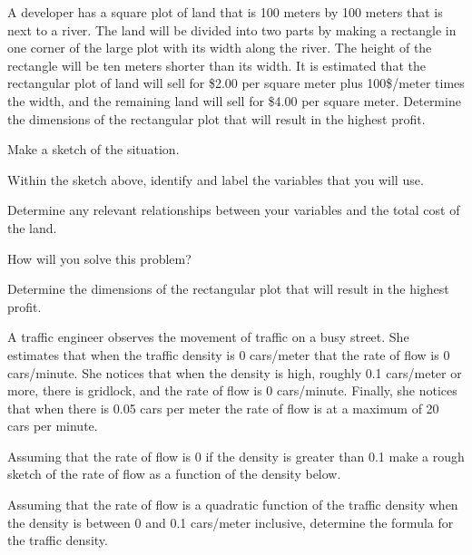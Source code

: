 \begin{problem}
\item A developer has a square plot of land that is 100 meters by 100
  meters that is next to a river. The land will be divided into two
  parts by making a rectangle in one corner of the large plot with its
  width along the river. The height of the rectangle will be ten
  meters shorter than its width. It is estimated that the rectangular
  plot of land will sell for \$2.00 per square meter plus 100\$/meter
  times the width, and the remaining land will sell for \$4.00 per
  square meter.  Determine the dimensions of the rectangular plot that
  will result in the highest profit.
  \begin{subproblem}
    \item Make a sketch of the situation.
      \vfill
    \item Within the sketch above, identify and label the variables
      that you will use.
    \item Determine any relevant relationships between your variables
      and the total cost of the land.
    \item How will you solve this problem?
      \vfill
    \item Determine the dimensions of the rectangular plot that will
      result in the highest profit.
      \vfill
      \vfill
  \end{subproblem}
  \clearpage
\item A traffic engineer observes the movement of traffic on a busy
  street. She estimates that when the traffic density is 0 cars/meter
  that the rate of flow is 0 cars/minute. She notices that when the
  density is high, roughly 0.1 cars/meter or more, there is gridlock,
  and the rate of flow is 0 cars/minute. Finally, she notices that
  when there is 0.05 cars per meter the rate of flow is at a maximum
  of 20 cars per minute.
  \begin{subproblem}
  \item Assuming that the rate of flow is 0 if the density is greater
    than 0.1 make a rough sketch of the rate of flow as a function of
    the density below.  
    \vfill
  \item Assuming that the rate of flow is a quadratic function of the
    traffic density when the density is between 0 and 0.1 cars/meter
    inclusive, determine the formula for the traffic density.
    \vfill
  \end{subproblem}
\end{problem}

